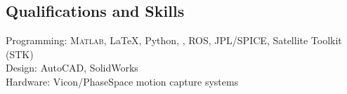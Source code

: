 \subsection*{Qualifications and Skills}

Programming: \textsc{Matlab}, \LaTeX{}, Python, \CC, ROS, JPL/SPICE, Satellite Toolkit (STK)  \\
Design: AutoCAD, SolidWorks \\
Hardware: Vicon/PhaseSpace motion capture systems
